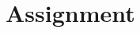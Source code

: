 \documentclass[color=usenames,dvipsnames]{beamer}\usepackage[]{graphicx}\usepackage[]{color}
\begin{document}






\section{Assignment}
\end{document}

